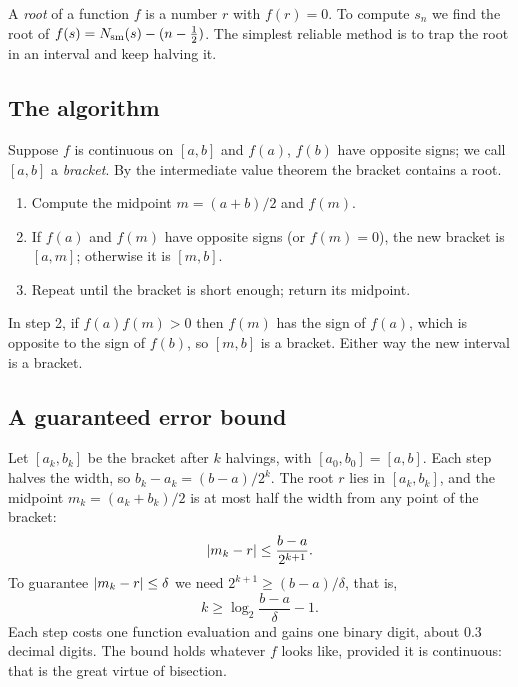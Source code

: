 A \emph{root} of a function $f$ is a number $r$ with $f(r)=0$. To compute $s_n$ we find the root of $f(s)=N_{\mathrm{sm}}(s)-(n-\tfrac12)$. The simplest reliable method is to trap the root in an interval and keep halving it.

\subsection{The algorithm}

Suppose $f$ is continuous on $[a,b]$ and $f(a)$, $f(b)$ have opposite signs; we call $[a,b]$ a \emph{bracket}. By the intermediate value theorem the bracket contains a root.
\begin{enumerate}
\item Compute the midpoint $m=(a+b)/2$ and $f(m)$.
\item If $f(a)$ and $f(m)$ have opposite signs (or $f(m)=0$), the new bracket is $[a,m]$; otherwise it is $[m,b]$.
\item Repeat until the bracket is short enough; return its midpoint.
\end{enumerate}
In step 2, if $f(a)f(m)>0$ then $f(m)$ has the sign of $f(a)$, which is opposite to the sign of $f(b)$, so $[m,b]$ is a bracket. Either way the new interval is a bracket.

\subsection{A guaranteed error bound}

Let $[a_k,b_k]$ be the bracket after $k$ halvings, with $[a_0,b_0]=[a,b]$. Each step halves the width, so $b_k-a_k=(b-a)/2^k$. The root $r$ lies in $[a_k,b_k]$, and the midpoint $m_k=(a_k+b_k)/2$ is at most half the width from any point of the bracket:
\begin{equation}
\left\lvert m_k-r\right\rvert\le\frac{b-a}{2^{k+1}} .
\label{eq:asymptotics-bisect-bound}
\end{equation}
To guarantee $\left\lvert m_k-r\right\rvert\le\delta$ we need $2^{k+1}\ge(b-a)/\delta$, that is,
\begin{equation}
k\ge\log_2\frac{b-a}{\delta}-1 .
\label{eq:asymptotics-bisect-steps}
\end{equation}
Each step costs one function evaluation and gains one binary digit, about $0.3$ decimal digits. The bound holds whatever $f$ looks like, provided it is continuous: that is the great virtue of bisection.

